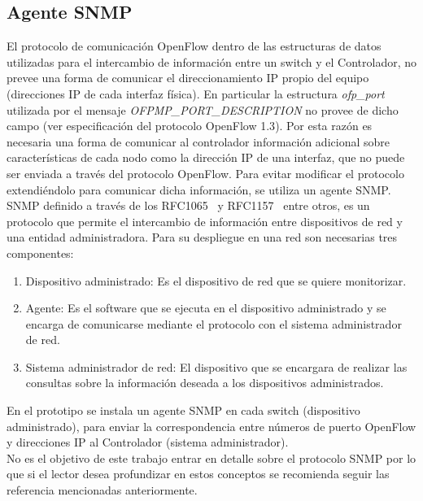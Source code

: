 \subsection{Agente SNMP}
El protocolo de comunicación OpenFlow dentro de las estructuras de datos utilizadas para el intercambio de información entre un switch y el Controlador, no prevee una forma de comunicar el direccionamiento IP propio del equipo (direcciones IP de cada interfaz física). En particular la estructura \textit{ofp\_port} utilizada por el mensaje \textit{OFPMP\_PORT\_DESCRIPTION} no provee de dicho campo (ver especificación del protocolo OpenFlow 1.3\citep{ofv133spec}). Por esta razón es necesaria una forma de comunicar al controlador información adicional sobre características de cada nodo como la dirección IP de una interfaz, que no puede ser enviada a través del protocolo OpenFlow. Para evitar modificar el protocolo extendiéndolo para comunicar dicha informaci\'on, se utiliza un agente SNMP.\\

SNMP definido a través de los RFC1065~\citep{rose1990structure} y RFC1157~\citep{case1989simple} entre otros, es un protocolo que permite el intercambio de información entre dispositivos de red y una entidad administradora. Para su despliegue en una red son necesarias tres componentes: 

\begin{enumerate}

\item Dispositivo administrado: Es el dispositivo de red que se quiere monitorizar.

\item Agente: Es el software que se ejecuta en el dispositivo administrado y se encarga de comunicarse mediante el protocolo con el sistema administrador de red.

\item Sistema administrador de red: El dispositivo que se encargara de realizar las consultas sobre la información deseada a los dispositivos administrados.

\end{enumerate}	

En el prototipo se instala un agente SNMP en cada switch (dispositivo administrado), para enviar la correspondencia entre números de puerto OpenFlow y direcciones IP al Controlador (sistema administrador).\\

No es el objetivo de este trabajo entrar en detalle sobre el protocolo SNMP por lo que si el lector desea profundizar en estos conceptos se recomienda seguir las referencia mencionadas anteriormente.

